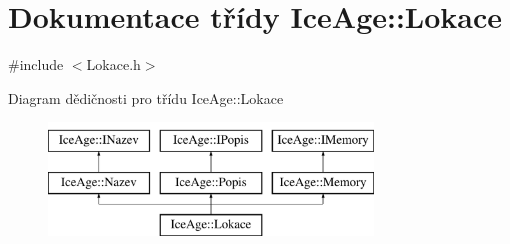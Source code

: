 \hypertarget{classIceAge_1_1Lokace}{}\section{Dokumentace třídy Ice\+Age\+:\+:Lokace}
\label{classIceAge_1_1Lokace}


{\ttfamily \#include $<$Lokace.\+h$>$}

Diagram dědičnosti pro třídu Ice\+Age\+:\+:Lokace\begin{figure}[H]
\begin{center}
\leavevmode
\includegraphics[height=3.000000cm]{da/d5b/classIceAge_1_1Lokace}
\end{center}
\end{figure}
